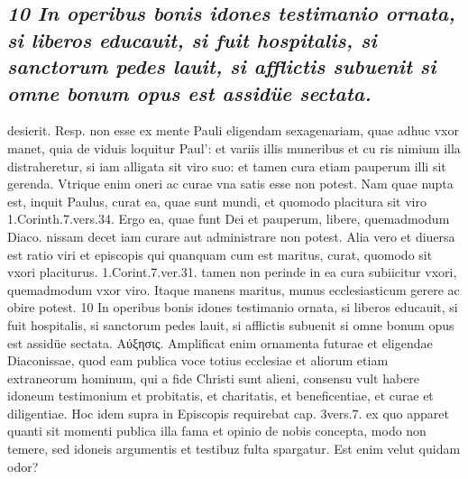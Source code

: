 \documentclass{article}
\begin{document}
\begin{pages}
\subsection*{\textit{10 In operibus bonis idones testimanio ornata, si liberos educauit, si fuit hospitalis, si sanctorum pedes lauit, si afflictis subuenit si omne bonum opus est assidüe sectata.}}desierit. Resp. non esse ex mente Pauli eligendam sexagenariam, quae adhuc vxor manet, quia de viduis loquitur Paul': et variis illis muneribus et cu ris nimium illa distraheretur, si iam alligata sit viro suo: et tamen cura etiam pauperum illi sit gerenda. Vtrique enim oneri ac curae vna satis esse non potest. Nam quae nupta est, inquit Paulus, curat ea, quae sunt mundi, et quomodo placitura sit viro 1.Corinth.7.vers.34. Ergo ea, quae funt Dei et pauperum, libere, quemadmodum Diaco. nissam decet iam curare aut administrare non potest. Alia vero et diuersa est ratio viri et episcopis qui quanquam cum est maritus, curat, quomodo sit vxori placiturus. 1.Corint.7.ver.31. tamen non perinde in ea cura subiicitur vxori, quemadmodum vxor viro. Itaque manens maritus, munus ecclesiasticum gerere ac obire potest. 10 In operibus bonis idones testimanio ornata, si liberos educauit, si fuit hospitalis, si sanctorum pedes lauit, si afflictis subuenit si omne bonum opus est assidüe sectata. Αύξησις. Amplificat enim ornamenta futurae et eligendae Diaconissae, quod eam publica voce totius ecclesiae et aliorum etiam extraneorum hominum, qui a fide Christi sunt alieni, consensu vult habere idoneum testimonium et probitatis, et charitatis, et beneficentiae, et curae et diligentiae. Hoc idem supra in Episcopis requirebat cap. 3vers.7. ex quo apparet quanti sit momenti publica illa fama et opinio de nobis concepta, modo non temere, sed idoneis argumentis et testibuz fulta spargatur. Est enim velut quidam odor?  \pend

\end{pages}
\end{document}
